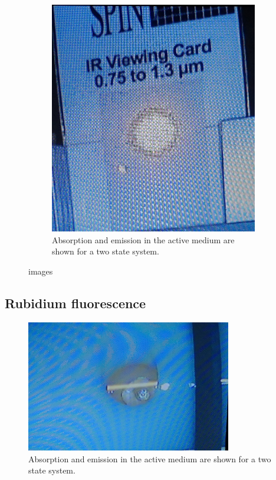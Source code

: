 \begin{figure}[ht]
\begin{subfigure}{0.49\textwidth}
        \includegraphics[width=\textwidth]{bilder/laser_after.jpg}
        \caption{Absorption and emission in the active medium are shown for a two state system. \cite{anleitungHeNe}}
        \label{fig:laser_after}
    \end{subfigure}
    \caption{images}
\end{figure}


\subsection{Rubidium fluorescence}
\begin{figure}[ht]
    \center
    \includegraphics[width=0.8\textwidth]{bilder/fluorescence.jpg}
    \caption{Absorption and emission in the active medium are shown for a two state system. \cite{anleitungHeNe}}
    \label{fig:fluorescence}
\end{figure}


